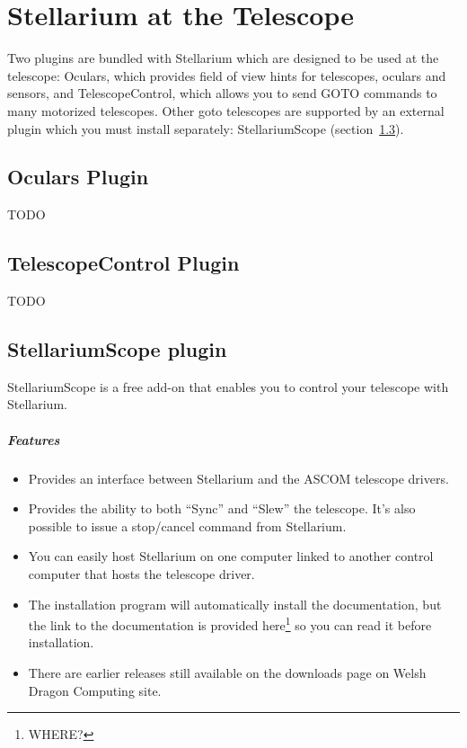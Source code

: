 
\chapter{Stellarium at the Telescope}
\label{ch:atTheTelescope}

Two plugins are bundled with Stellarium which are designed to be used
at the telescope: Oculars, which provides field of view hints for
telescopes, oculars and sensors, and TelescopeControl, which allows
you to send GOTO commands to many motorized telescopes. Other goto
telescopes are supported by an external plugin which you must install
separately: StellariumScope (section~\ref{sec:plugins:StellariumScope}). 

\section{Oculars Plugin}
\label{sec:plugins:Oculars}

TODO

\section{TelescopeControl Plugin}
\label{sec:plugins:TelescopeControl}

TODO

\section{StellariumScope plugin}
\label{sec:plugins:StellariumScope}
StellariumScope is a free add-on that enables you to control your telescope with Stellarium. 

\paragraph{Features}
\begin{itemize}
\item Provides an interface between Stellarium and the ASCOM telescope drivers.
\item Provides the ability to both ``Sync'' and ``Slew'' the
  telescope. It's also possible to issue a stop/cancel command from
  Stellarium.
\item You can easily host Stellarium on one computer linked to another
  control computer that hosts the telescope driver.
\item The installation program will automatically install the
  documentation, but the link to the documentation is provided
  here\footnote{WHERE?} so you can read it before installation.
\item There are earlier releases still available on the downloads page on
  Welsh Dragon Computing site.
\end{itemize}


